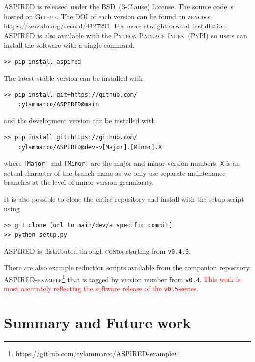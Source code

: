 \documentclass[linenumbers, twocolumn]{aastex631}
\begin{document}
\textsc{ASPIRED} is released under the BSD~(3-Clause) License. The source code
is hosted on \textsc{Github}. The DOI of each version can be found on 
\textsc{zenodo}: \url{https://zenodo.org/record/4127294}. For more
straightforward installation, \textsc{ASPIRED} is also available with the
\textsc{Python Package Index}~(\textsc{PyPI}) so users can install the software with a single command. 
\begin{verbatim}
>> pip install aspired
\end{verbatim}
The latest stable version can be installed with
\begin{verbatim}
>> pip install git+https://github.com/
    cylammarco/ASPIRED@main
\end{verbatim}
and the development version can be installed with 
\begin{verbatim}
>> pip install git+https://github.com/
    cylammarco/ASPIRED@dev-v[Major].[Minor].X
\end{verbatim} where \verb+[Major]+ and \verb+[Minor]+ are the major and minor
version numbers. \verb+X+ is an actual character of the branch name as we only
use separate maintenance branches at the level of minor version granularity.

It is also possible to clone the entire repository
and install with the setup script using
\begin{verbatim}
>> git clone [url to main/dev/a specific commit]
>> python setup.py
\end{verbatim}
ASPIRED is distributed through \textsc{conda} starting from \texttt{v0.4.9}.

There are also example reduction scripts available from the companion repository
\textsc{ASPIRED-example}\footnote{\url{https://github.com/cylammarco/ASPIRED-example}}
that is tagged by version number from \texttt{v0.4}. \textcolor{red}{This work is most accurately
reflecting the software release of the \texttt{v0.5}-series.}


\section{Summary and Future work}
\label{sec:summary}
\end{document}
